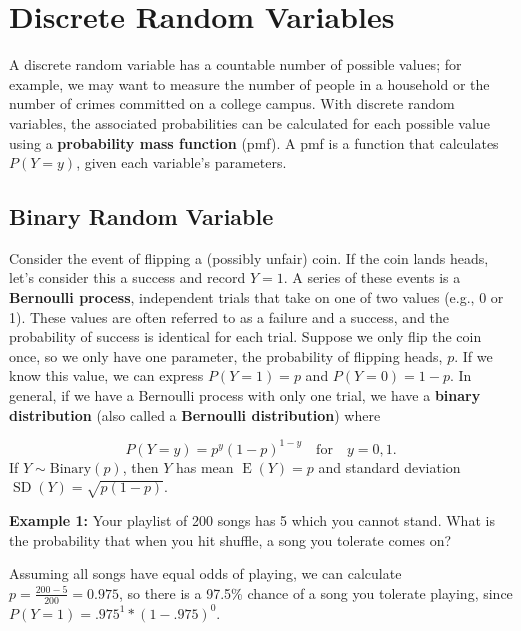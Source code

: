 \documentclass[
]{krantz}
\newcommand{\E}{\operatorname{E}}
\newcommand{\SD}{\operatorname{SD}}
\begin{document}
\section{Discrete Random Variables}\label{discrete-random-variables}

A discrete random variable has a countable number of possible values; for example, we may want to measure the number of people in a household or the number of crimes committed on a college campus. With discrete random variables, the associated probabilities can be calculated for each possible value using a \textbf{probability mass function} (pmf).  A pmf is a function that calculates \(P(Y=y)\), given each variable's parameters.

\subsection{Binary Random Variable}\label{sec-binary}

Consider the event of flipping a (possibly unfair) coin. If the coin lands heads, let's consider this a success and record \(Y = 1\).
A series of these events is a \textbf{Bernoulli process},  independent trials that take on one of two values (e.g., 0 or 1). These values are often referred to as a failure and a success, and the probability of success is identical for each trial.
Suppose we only flip the coin once, so we only have one parameter, the probability of flipping heads, \(p\). If we know this value, we can express \(P(Y=1) = p\) and \(P(Y=0) = 1-p\). In general, if we have a Bernoulli process with only one trial, we have a \textbf{binary distribution} (also called a \textbf{Bernoulli distribution})  where

\begin{equation} 
P(Y = y) = p^y(1-p)^{1-y} \quad \textrm{for} \quad y = 0, 1.
\label{eq:binaryRV}
\end{equation}
If \(Y \sim \textrm{Binary}(p)\), then \(Y\) has mean \(\E(Y) = p\) and standard deviation \(\SD(Y) = \sqrt{p(1-p)}\).

\textbf{Example 1:} Your playlist of 200 songs has 5 which you cannot stand. What is the probability that when you hit shuffle, a song you tolerate comes on?

Assuming all songs have equal odds of playing, we can calculate \(p = \frac{200-5}{200} = 0.975\), so there is a 97.5\% chance of a song you tolerate playing, since \(P(Y=1)=.975^1*(1-.975)^0\).
\end{document}
